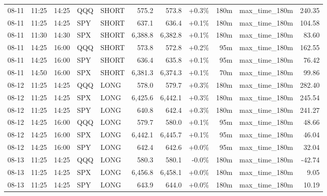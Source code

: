 \documentclass[11pt,a4paper,twoside]{article}
\begin{document}
\begin{center}
\begin{longtable}{>{\color{txtmain}}l l l l l r r r r >{\color{txtmain}}l r}
08-11 & 11:25 & 14:25 & QQQ & SHORT & 575.2 & 573.8 & \textcolor{wingreen}{+0.3\%} & 180m & max\_time\_180m & \textcolor{wingreen}{240.35} \\
08-11 & 11:25 & 14:25 & SPY & SHORT & 637.1 & 636.4 & \textcolor{wingreen}{+0.1\%} & 180m & max\_time\_180m & \textcolor{wingreen}{104.58} \\
08-11 & 11:30 & 14:30 & SPX & SHORT & 6,388.8 & 6,382.8 & \textcolor{wingreen}{+0.1\%} & 180m & max\_time\_180m & \textcolor{wingreen}{83.60} \\
08-11 & 14:25 & 16:00 & QQQ & SHORT & 573.8 & 572.8 & \textcolor{wingreen}{+0.2\%} & 95m & max\_time\_180m & \textcolor{wingreen}{162.55} \\
08-11 & 14:25 & 16:00 & SPY & SHORT & 636.4 & 635.8 & \textcolor{wingreen}{+0.1\%} & 95m & max\_time\_180m & \textcolor{wingreen}{76.42} \\
08-11 & 14:50 & 16:00 & SPX & SHORT & 6,381.3 & 6,374.3 & \textcolor{wingreen}{+0.1\%} & 70m & max\_time\_180m & \textcolor{wingreen}{99.86} \\
08-12 & 11:25 & 14:25 & QQQ & LONG & 578.0 & 579.7 & \textcolor{wingreen}{+0.3\%} & 180m & max\_time\_180m & \textcolor{wingreen}{282.40} \\
08-12 & 11:25 & 14:25 & SPX & LONG & 6,425.6 & 6,442.1 & \textcolor{wingreen}{+0.3\%} & 180m & max\_time\_180m & \textcolor{wingreen}{245.54} \\
08-12 & 11:25 & 14:25 & SPY & LONG & 640.8 & 642.4 & \textcolor{wingreen}{+0.3\%} & 180m & max\_time\_180m & \textcolor{wingreen}{241.27} \\
08-12 & 14:25 & 16:00 & QQQ & LONG & 579.7 & 580.0 & \textcolor{wingreen}{+0.1\%} & 95m & max\_time\_180m & \textcolor{wingreen}{48.66} \\
08-12 & 14:25 & 16:00 & SPX & LONG & 6,442.1 & 6,445.7 & \textcolor{wingreen}{+0.1\%} & 95m & max\_time\_180m & \textcolor{wingreen}{46.04} \\
08-12 & 14:25 & 16:00 & SPY & LONG & 642.4 & 642.6 & \textcolor{wingreen}{+0.0\%} & 95m & max\_time\_180m & \textcolor{wingreen}{32.04} \\
08-13 & 11:25 & 14:25 & QQQ & LONG & 580.3 & 580.1 & \textcolor{lossred}{-0.0\%} & 180m & max\_time\_180m & \textcolor{lossred}{-42.74} \\
08-13 & 11:25 & 14:25 & SPX & LONG & 6,456.8 & 6,458.1 & \textcolor{wingreen}{+0.0\%} & 180m & max\_time\_180m & \textcolor{wingreen}{9.05} \\
08-13 & 11:25 & 14:25 & SPY & LONG & 643.9 & 644.0 & \textcolor{wingreen}{+0.0\%} & 180m & max\_time\_180m & \textcolor{wingreen}{10.19} \\

\end{longtable}
\end{center}
\end{document}
